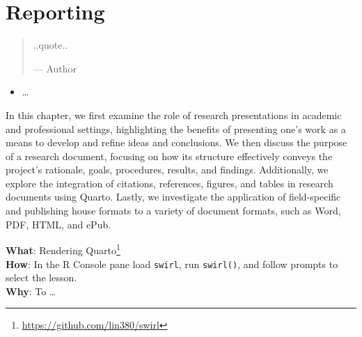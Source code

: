\documentclass[
  letterpaper,
]{latex/krantz}
\providecommand{\tightlist}{%
  \setlength{\itemsep}{0pt}\setlength{\parskip}{0pt}}\usepackage{longtable,booktabs,array}
\DeclareRobustCommand{\href}[2]{#2\footnote{\url{#1}}}
\begin{document}
\hypertarget{sec-reporting}{%
\chapter{Reporting}\label{sec-reporting}}

\begin{quote}
..quote..

--- Author
\end{quote}

\begin{tcolorbox}[enhanced jigsaw, colframe=quarto-callout-note-color-frame, titlerule=0mm, coltitle=black, colback=white, opacitybacktitle=0.6, colbacktitle=quarto-callout-note-color!10!white, left=2mm, arc=.35mm, leftrule=.75mm, rightrule=.15mm, bottomtitle=1mm, toptitle=1mm, breakable, bottomrule=.15mm, title=\textcolor{quarto-callout-note-color}{\faInfo}\hspace{0.5em}{Keys}, toprule=.15mm, opacityback=0]

\begin{itemize}
\tightlist
\item
  \ldots{}
\end{itemize}

\end{tcolorbox}

In this chapter, we first examine the role of research presentations in
academic and professional settings, highlighting the benefits of
presenting one's work as a means to develop and refine ideas and
conclusions. We then discuss the purpose of a research document,
focusing on how its structure effectively conveys the project's
rationale, goals, procedures, results, and findings. Additionally, we
explore the integration of citations, references, figures, and tables in
research documents using Quarto. Lastly, we investigate the application
of field-specific and publishing house formats to a variety of document
formats, such as Word, PDF, HTML, and ePub.

\begin{tcolorbox}[enhanced jigsaw, colframe=quarto-callout-tip-color-frame, titlerule=0mm, coltitle=black, colback=white, opacitybacktitle=0.6, colbacktitle=quarto-callout-tip-color!10!white, left=2mm, arc=.35mm, leftrule=.75mm, rightrule=.15mm, bottomtitle=1mm, toptitle=1mm, breakable, bottomrule=.15mm, title=\textcolor{quarto-callout-tip-color}{\faLightbulb}\hspace{0.5em}{Swirl}, toprule=.15mm, opacityback=0]

\textbf{What}: \href{https://github.com/lin380/swirl}{Rendering
Quarto}\\
\textbf{How}: In the R Console pane load \texttt{swirl}, run
\texttt{swirl()}, and follow prompts to select the lesson.\\
\textbf{Why}: To \ldots{}

\end{tcolorbox}
\end{document}
